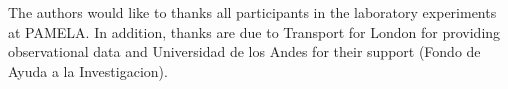 \begin{acknowledgements}
    The authors would like to thanks all participants in the laboratory experiments at PAMELA. In addition, thanks are due to Transport for London for providing observational data and Universidad de los Andes for their support (Fondo de Ayuda a la Investigacion).
  \end{acknowledgements}